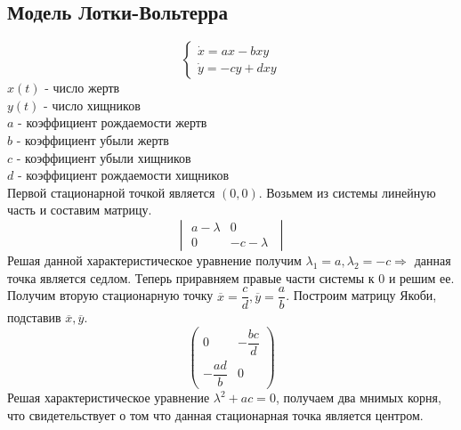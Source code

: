\subsection{Модель Лотки-Вольтерра}
\begin{equation}
  \begin{cases}
    \dot{x}=ax-bxy\\
    \dot{y}=-cy+dxy
  \end{cases}
\end{equation}
$x(t)$ - число жертв\\
$y(t)$ - число хищников\\
$a$ - коэффициент рождаемости жертв\\
$b$ - коэффициент убыли жертв\\
$c$ - коэффициент убыли хищников \\
$d$ - коэффициент рождаемости хищников\\
Первой стационарной точкой является $(0,0)$. Возьмем из системы линейную часть и составим матрицу.
\begin{equation}
  \begin{vmatrix}
  a-\lambda&0\\0&-c-\lambda\;
\end{vmatrix}
\end{equation}
Решая данной характеристическое уравнение получим $\lambda_1=a, \lambda_2=-c\Rightarrow$ данная точка является седлом.
Теперь приравняем правые части системы к 0 и решим ее. Получим вторую стационарную точку $\overline{x}=\dfrac{c}{d},
\overline{y}=\dfrac{a}{b}$. Построим матрицу Якоби, подставив $\overline{x},\overline{y}$.
\begin{equation}
  \begin{pmatrix}
    0&-\dfrac{bc}{d}\\-\dfrac{ad}{b}&0
  \end{pmatrix}
\end{equation}
Решая характеристическое уравнение $\lambda^2+ac=0$, получаем два мнимых корня, что свидетельствует о том что данная
стационарная точка является центром.

